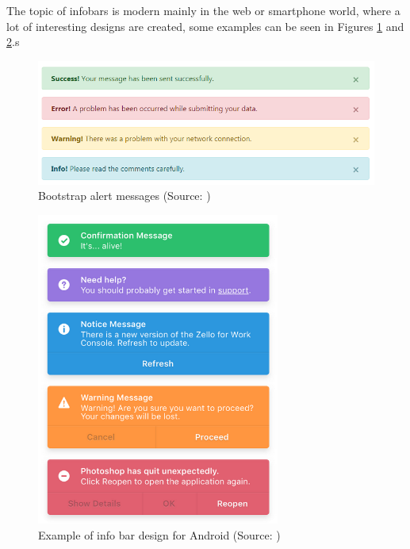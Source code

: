 \documentclass[a4paper,10pt,twoside]{article}
\begin{document}
\noindent The topic of infobars is modern mainly in the web or smartphone world, where a lot of interesting designs are created, some examples can be seen in Figures \ref{fig:bootstrap_infobar} and \ref{fig:infobar_android}.s

\vspace{0.3cm}
\begin{figure}[hbt!] 
\begin{center}
\includegraphics[width=15cm]{../pictures/bootstrap_infobar.png} 
\caption[Bootstrap alert messages]{Bootstrap alert messages (Source: \cite{bootstrap})}
\label{fig:bootstrap_infobar}
\end{center}
\end{figure}

\vspace{0.3cm}
\begin{figure}[hbt!] 
\begin{center}
\includegraphics[width=8cm]{../pictures/infobar_android.png} 
\caption[Example of info bar design for Android]{Example of info bar design for Android (Source: \cite{pinterest})}
\label{fig:infobar_android}
\end{center}
\end{figure}
\end{document}
